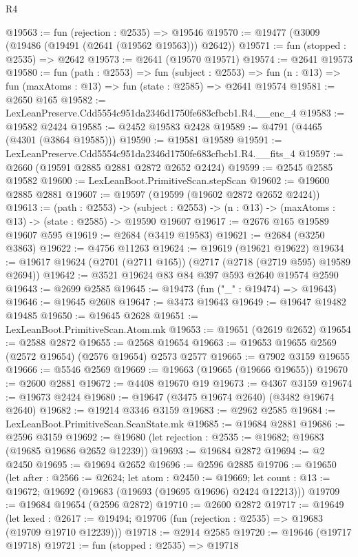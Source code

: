 \begin{lexlean}{R4}
\begin{coremodule}
@19563 := fun (rejection : @2535) => @19546
@19570 := @19477 (@3009 (@19486 (@19491 (@2641 (@19562 @19563))) @2642))
@19571 := fun (stopped : @2535) => @2642
@19573 := @2641 (@19570 @19571)
@19574 := @2641 @19573
@19580 := fun (path : @2553) =>
  fun (subject : @2553) =>
  fun (n : @13) => fun (maxAtoms : @13) => fun (state : @2585) => @2641 @19574
@19581 := @2650 @165
@19582 := LexLeanPreserve.Cdd5554c951da2346d1750fe683cfbcb1.R4.__enc_4
@19583 := @19582 @2424
@19585 := @2452 @19583 @2428
@19589 := @4791 (@4465 (@4301 (@3864 @19585)))
@19590 := @19581 @19589
@19591 := LexLeanPreserve.Cdd5554c951da2346d1750fe683cfbcb1.R4.__fits_4
@19597 := @2660 (@19591 @2885 @2881 @2872 @2652 @2424)
@19599 := @2545 @2585 @19582
@19600 := LexLeanBoot.PrimitiveScan.stepScan
@19602 := @19600 @2885 @2881
@19607 := @19597 (@19599 (@19602 @2872 @2652 @2424))
@19613 := (path : @2553) ->
  (subject : @2553) -> (n : @13) -> (maxAtoms : @13) -> (state : @2585) -> @19590 @19607
@19617 := @2676 @165 @19589 @19607 @595
@19619 := @2684 (@3419 @19583)
@19621 := @2684 (@3250 @3863)
@19622 := @4756 @11263
@19624 := @19619 (@19621 @19622)
@19634 := @19617 @19624 (@2701 (@2711 @165)) (@2717 (@2718 (@2719 @595) @19589 @2694))
@19642 := @3521 @19624 @83 @84 @397 @593 @2640 @19574 @2590
@19643 := @2699 @2585
@19645 := @19473 (fun ("_" : @19474) => @19643)
@19646 := @19645 @2608
@19647 := @3473 @19643
@19649 := @19647 @19482 @19485
@19650 := @19645 @2628
@19651 := LexLeanBoot.PrimitiveScan.Atom.mk
@19653 := @19651 (@2619 @2652)
@19654 := @2588 @2872
@19655 := @2568 @19654
@19663 := @19653 @19655 @2569 (@2572 @19654) (@2576 @19654) @2573 @2577
@19665 := @7902 @3159 @19655
@19666 := @5546 @2569
@19669 := @19663 (@19665 (@19666 @19655))
@19670 := @2600 @2881
@19672 := @4408 @19670 @19
@19673 := @4367 @3159
@19674 := @19673 @2424
@19680 := @19647 (@3475 @19674 @2640) (@3482 @19674 @2640)
@19682 := @19214 @3346 @3159
@19683 := @2962 @2585
@19684 := LexLeanBoot.PrimitiveScan.ScanState.mk
@19685 := @19684 @2881
@19686 := @2596 @3159
@19692 := @19680 (let rejection : @2535 := @19682; @19683 (@19685 @19686 @2652 @12239))
@19693 := @19684 @2872
@19694 := @2 @2450
@19695 := @19694 @2652
@19696 := @2596 @2885
@19706 := @19650
    (let after : @2566 := @2624;
    let atom : @2450 := @19669;
    let count : @13 := @19672; @19692 (@19683 (@19693 (@19695 @19696) @2424 @12213)))
@19709 := @19684 @19654 (@2596 @2872)
@19710 := @2600 @2872
@19717 := @19649
    (let lexed : @2617 := @19494; @19706 (fun (rejection : @2535) => @19683 (@19709 @19710 @12239)))
@19718 := @2914 @2585
@19720 := @19646 (@19717 @19718)
@19721 := fun (stopped : @2535) => @19718

\end{coremodule}
\end{lexlean}

